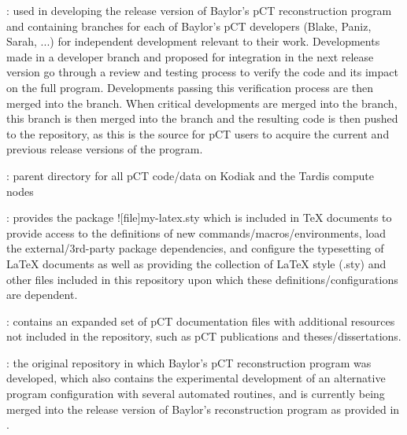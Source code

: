 \begin{tcbenvironment}
\begin{tcbparagraph}
\begin{ThinEnum}[parsep=1mm]
	\begin{ThinEnum}[parsep=1mm]
		\item {} : used in developing the release version of Baylor's pCT reconstruction program and containing branches for each of Baylor's pCT developers (Blake, Paniz, Sarah, ...) for independent development relevant to their work.  Developments made in a developer branch and proposed for integration in the next release version go through a review and testing process to verify the code and its impact on the full program.  Developments passing this verification process are then merged into the  branch.  When critical developments are merged into the  branch, this branch is then merged into the  branch and the resulting code is then pushed to the  repository, as this is the source for pCT users to acquire the current and previous release versions of the program.
	\end{ThinEnum}
	\item {} : parent directory for all pCT code/data on Kodiak and the Tardis compute nodes
	\begin{ThinEnum}[parsep=1mm]
		\item {} : provides the package \docentry![file]{my-latex.sty} which is included in TeX documents to provide access to the definitions of new commands/macros/environments, load the external/3rd-party package dependencies, and configure the typesetting of LaTeX documents as well as providing the collection of LaTeX style (.sty) and other files included in this repository upon which these definitions/configurations are dependent.
		\item {} : contains an expanded set of pCT documentation files with additional resources not included in the  repository, such as pCT publications and theses/dissertations.
		\item {} : the original repository in which Baylor's pCT reconstruction program was developed, which also contains the experimental development of an alternative program configuration with several automated routines, and is currently being merged into the release version of Baylor's reconstruction program as provided in .

\end{ThinEnum}
\end{ThinEnum}
\end{tcbparagraph}
\end{tcbenvironment}
